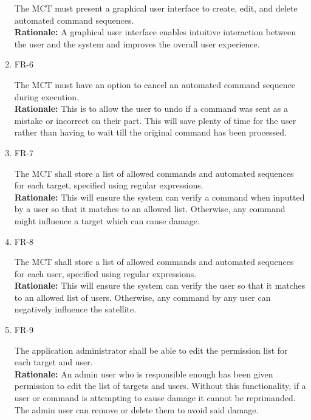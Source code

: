 \documentclass[12pt]{article}
\begin{document}
\begin{enumerate}
    The MCT must present a graphical user interface to create, edit, and delete automated command sequences. \\
    \textbf{Rationale:} A graphical user interface enables intuitive interaction between the user and the system and improves the overall user experience. 

    \item{FR-6\\}
        
    The MCT must have an option to cancel an automated command sequence during execution. \\
    \textbf{Rationale:} This is to allow the user to undo if a command was sent as a mistake or incorrect on their part. This will save plenty of time for the user rather than having to wait till the original command has been processed. 

    \item{FR-7\\}
    
    The MCT shall store a list of allowed commands and automated sequences for each target, specified using regular expressions. \\
    \textbf{Rationale:} This will ensure the system can verify a command when inputted by a user so that it matches to an allowed list. Otherwise, any command might influence a target which can cause damage.

    \item{FR-8\\}
        
    The MCT shall store a list of allowed commands and automated sequences for each user, specified using regular expressions. \\
    \textbf{Rationale:} This will ensure the system can verify the user so that it matches to an allowed list of users. Otherwise, any command by any user can negatively influence the satellite. 

    \item{FR-9\\}
    
    The application administrator shall be able to edit the permission list for each target and user. \\
    \textbf{Rationale:} An admin user who is responsible enough has been given permission to edit the list of targets and users. Without this functionality, if a user or command is attempting to cause damage it cannot be reprimanded. The admin user can remove or delete them to avoid said damage. 


\end{enumerate}
\end{document}
